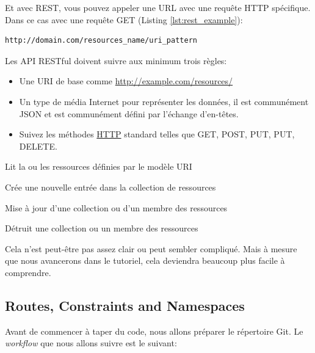 \documentclass[]{report}
\begin{document}
    Et avec REST, vous pouvez appeler une URL avec une requête HTTP spécifique. Dans ce cas avec une requête GET (Listing \ref{lst:rest_example}):

    \begin{scriptsize}
    \begin{lstlisting}[label={lst:rest_example}, caption={Un exemple d'appel REST}]
    http://domain.com/resources_name/uri_pattern
    \end{lstlisting}
    \end{scriptsize}

    Les API RESTful doivent suivre aux minimum trois règles:

    \begin{itemize}
      \item Une URI de base comme \href{http://example.com/resources/}{http://example.com/resources/}
      \item Un type de média Internet pour représenter les données, il est communément JSON et est communément défini par l'échange d'en-têtes.
      \item Suivez les méthodes \href{https://fr.wikipedia.org/wiki/Hypertext_Transfer_Protocol}{HTTP} standard telles que GET, POST, PUT, PUT, DELETE.
    \end{itemize}

    \begin{description}\label{desc:http_verbs}
      \item[GET] Lit la ou les ressources définies par le modèle URI
      \item[POST] Crée une nouvelle entrée dans la collection de ressources
      \item[PUT] Mise à jour d'une collection ou d'un membre des ressources
      \item[DELETE] Détruit une collection ou un membre des ressources
    \end{description}

    Cela n'est peut-être pas assez clair ou peut sembler compliqué. Mais à mesure que nous avancerons dans le tutoriel, cela deviendra beaucoup plus facile à comprendre.

    \subsection{Routes, Constraints and Namespaces}\label{subsec:routes_constraints_namespaces}

      Avant de commencer à taper du code, nous allons préparer le répertoire Git. Le \textit{workflow} que nous allons suivre est le suivant:
\end{document}
